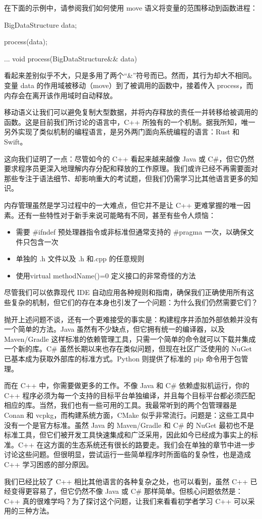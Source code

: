 在下面的示例中，请参阅我们如何使用 move 语义将变量的范围移动到函数进程：

\begin{cpp}
BigDataStructure data{};

process(data);

...
void process(BigDataStructure&& data){
}
\end{cpp}

看起来差别似乎不大，只是多用了两个“\&”符号而已。然而，其行为却大不相同。变量 data 的作用域被移动（move）到了被调用的函数中，接着传入 process，而内存会在离开该作用域时自动释放。

移动语义让我们可以避免复制大型数据，并将内存释放的责任一并转移给被调用的函数。这是目前我们所讨论的语言中，C++ 所独有的一个机制。据我所知，唯一另外实现了类似机制的编程语言，是另外两门面向系统编程的语言：Rust 和 Swift。

这向我们证明了一点：尽管如今的 C++ 看起来越来越像 Java 或 C\#，但它仍然要求程序员更深入地理解内存分配和释放的工作原理。我们或许已经不再需要面对那些专注于语法细节、却影响重大的考试题，但我们仍需学习比其他语言更多的知识。

内存管理虽然是学习过程中的一大难点，但它并不是让 C++ 更难掌握的唯一因素。还有一些特性对于新手来说可能略有不同，甚至有些令人烦恼：

\begin{itemize}
\item 
需要 \#ifndef 预处理器指令或非标准但通常支持的 \#pragma 一次，以确保文件只包含一次

\item 单独的 .h 文件以及 .h 和.cpp 的任意规则
\item 使用virtual methodName()=0 定义接口的非常奇怪的方法
\end{itemize}

尽管我们可以依靠现代 IDE 自动应用各种规则和指南，确保我们正确使用所有这些复杂的机制，但它们的存在本身也引发了一个问题：为什么我们仍然需要它们？

抛开上述问题不谈，还有一个更难接受的事实是：构建程序并添加外部依赖并没有一个简单的方法。Java 虽然有不少缺点，但它拥有统一的编译器，以及 Maven/Gradle 这样标准的依赖管理工具，只需一个简单的命令就可以下载并集成一个新的库。C\# 虽然长期以来也存在类似问题，但现在社区广泛使用的 NuGet 已基本成为获取外部库的标准方式。Python 则提供了标准的 pip 命令用于包管理。

而在 C++ 中，你需要做更多的工作。不像 Java 和 C\# 依赖虚拟机运行，你的 C++ 程序必须为每一个支持的目标平台单独编译，并且每个目标平台都必须匹配相应的库。当然，我们也有一些可用的工具。我最常听到的两个包管理器是 Conan 和 vcpkg，而构建系统方面，CMake 似乎非常流行。问题是：这些工具中没有一个是官方标准。虽然 Java 的 Maven/Gradle 和 C\# 的 NuGet 最初也不是标准工具，但它们被开发工具快速集成和广泛采用，因此如今已经成为事实上的标准。C++ 在这方面的生态系统还有很长的路要走。我们会在单独的章节中进一步讨论这些问题。但很明显，尝试运行一些简单程序时所面临的复杂性，也是造成 C++ 学习困惑的部分原因。

我们已经比较了 C++ 相比其他语言的各种复杂之处，也可以看到，虽然 C++ 已经变得更容易了，但它仍然不像 Java 或 C\# 那样简单。但核心问题依然是：C++ 真的很难学吗？为了探讨这个问题，让我们来看看初学者学习 C++ 可以采用的三种方法。



